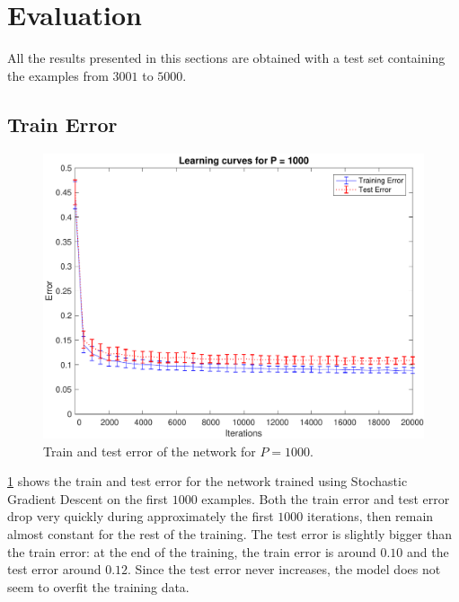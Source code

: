 \section{Evaluation}
\label{sec:evaluation}

All the results presented in this sections are obtained with a test set containing the examples from $3001$ to $5000$.

\subsection{Train Error}
\begin{figure}[t]
	\centering
	\includegraphics[width=\columnwidth]{figures/error}
    \caption{Train and test error of the network for $P = 1000$.}
	\label{fig:training_error}
\end{figure}

\cref{fig:training_error} shows the train and test error for the network trained using Stochastic Gradient Descent on the first $1000$ examples.
Both the train error and test error drop very quickly during approximately the first $1000$ iterations, then remain almost constant for the rest of the training.
The test error is slightly bigger than the train error:
at the end of the training, the train error is around $0.10$ and the test error around $0.12$.
Since the test error never increases, the model does not seem to overfit the training data.

